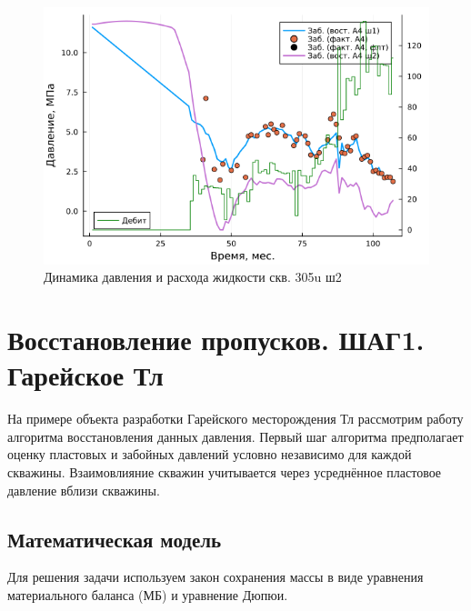 \documentclass[14pt]{article}
\begin{document}
\begin{figure}[!htb]
	\centering
	\includegraphics[width=1.0\linewidth]{pic/pw_305u(3)_a4_stp2}
	\caption{Динамика давления и расхода жидкости скв. 305u ш2}
	\label{fig:pw305u3a4stp2}
\end{figure}


\section{Восстановление пропусков. ШАГ1. Гарейское Тл}
На примере объекта разработки Гарейского месторождения Тл рассмотрим  работу алгоритма восстановления данных давления. Первый шаг алгоритма предполагает оценку пластовых и забойных давлений условно независимо для каждой скважины. Взаимовлияние скважин учитывается через усреднённое пластовое давление вблизи скважины.

\subsection{Математическая модель}
    Для решения задачи используем закон сохранения массы в виде уравнения материального баланса (МБ) и уравнение Дюпюи. 
    
\end{document}

